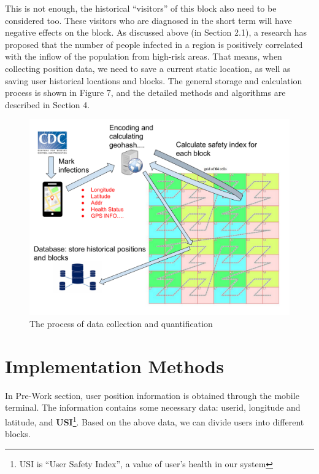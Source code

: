 \documentclass[sigplan,screen]{acmart}
\begin{document}
This is not enough, the historical ``visitors'' of this block also need to be considered too.
These visitors who are diagnosed in the short term will have negative effects on the block.
As discussed above (in Section 2.1), a research has proposed that the number of people infected in a region is positively correlated with the inflow of the population from high-risk areas.
That means, when collecting position data, we need to save a current static location, as well as saving user historical locations and blocks.
The general storage and calculation process is shown in Figure 7, and the detailed methods and algorithms are described in Section 4.
\begin{figure}[htb]
	\centering\includegraphics[width=\linewidth]{process.pdf}
	\caption{The process of data collection and quantification}
\end{figure}
\section{Implementation Methods}
In Pre-Work section, user position information is obtained through the mobile terminal.
The information contains some necessary data: userid, longitude and latitude, and \textbf{USI}\footnote{USI is ``User Safety Index'', a value of user's health in our system}.
Based on the above data, we can divide users into different blocks.
\end{document}
